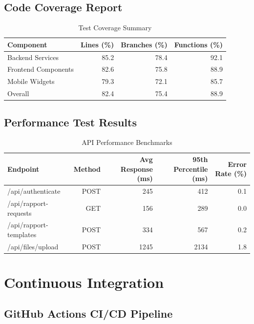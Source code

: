 \subsection{Code Coverage Report}

\begin{table}[H]
\centering
\caption{Test Coverage Summary}
\label{tab:test_coverage}
\begin{tabular}{@{}lrrr@{}}
\toprule
Component & Lines (\%) & Branches (\%) & Functions (\%) \\
\midrule
Backend Services & 85.2 & 78.4 & 92.1 \\
Frontend Components & 82.6 & 75.8 & 88.9 \\
Mobile Widgets & 79.3 & 72.1 & 85.7 \\
Overall & 82.4 & 75.4 & 88.9 \\
\bottomrule
\end{tabular}
\end{table}

\subsection{Performance Test Results}

\begin{table}[H]
\centering
\caption{API Performance Benchmarks}
\label{tab:performance_results}
\begin{tabular}{@{}lrrrr@{}}
\toprule
Endpoint & Method & Avg Response (ms) & 95th Percentile (ms) & Error Rate (\%) \\
\midrule
/api/authenticate & POST & 245 & 412 & 0.1 \\
/api/rapport-requests & GET & 156 & 289 & 0.0 \\
/api/rapport-templates & POST & 334 & 567 & 0.2 \\
/api/files/upload & POST & 1245 & 2134 & 1.8 \\
\bottomrule
\end{tabular}
\end{table}

\section{Continuous Integration}

\subsection{GitHub Actions CI/CD Pipeline}


